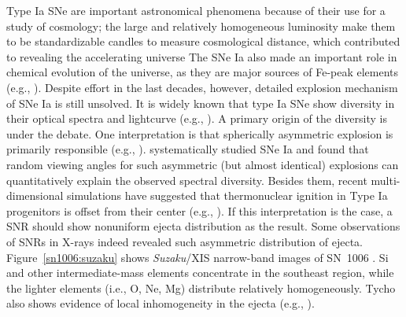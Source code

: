 \documentclass[11pt,a4paper]{article}
\begin{document}
{Type Ia SNe are important astronomical phenomena because of their use
for a study of cosmology; the large and relatively homogeneous
luminosity make them to be standardizable candles to measure
cosmological distance, which contributed to revealing the accelerating
universe \citep{riess98, perlmutter99}
The SNe Ia also made an important role in chemical evolution of the universe, as
they are major sources of Fe-peak elements (e.g., 
\citealt{nomoto84}).  Despite effort in the last decades, however,
detailed explosion mechanism of SNe Ia is still unsolved. It is widely
known that type Ia SNe show diversity in their optical spectra and
lightcurve (e.g., \citealt{phillips99, benetti05}).  A primary origin
of the diversity is under the debate. One interpretation is that
spherically asymmetric explosion is primarily responsible (e.g.,
\citealt{kasen09}).  \citet{maeda10a} systematically studied SNe Ia
and found that random viewing angles for such asymmetric (but almost
identical) explosions can quantitatively explain the observed spectral
diversity. Besides them, recent multi-dimensional simulations have
suggested that thermonuclear ignition in Type Ia progenitors is offset
from their center (e.g., \citealt{woosley04, kuhlen06}).  If this
interpretation is the case, a SNR should show nonuniform ejecta
distribution as the result. Some observations of SNRs in X-rays indeed
revealed such asymmetric distribution of ejecta.
Figure~\ref{sn1006:suzaku} shows {\it Suzaku}/XIS narrow-band images of
SN~1006 \citep{uchida13}.  Si and other intermediate-mass elements
concentrate in the southeast region, while the lighter elements (i.e.,
O, Ne, Mg) distribute relatively homogeneously.  Tycho also shows
evidence of local inhomogeneity in the ejecta (e.g.,
\citealt{vancura95}).


}
\end{document}
